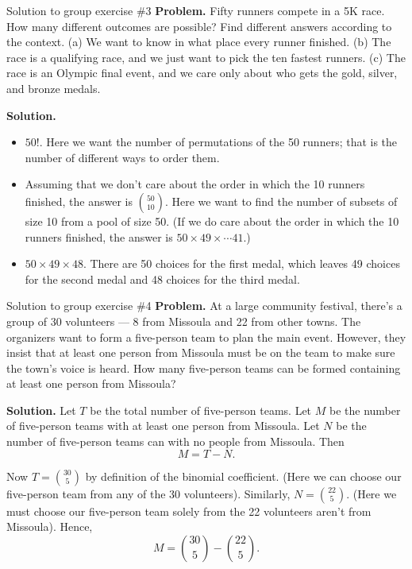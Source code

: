 \documentclass[10pt]{beamer}
\begin{document}
\begin{frame}{Solution to group exercise \#3}
\textbf{Problem.}
Fifty runners compete in a 5K race.  How many different outcomes are possible? Find different answers according to the context. (a) We want to know in what place every runner finished.  (b) The race is a qualifying race, and we just want to pick the ten fastest runners. (c) The race is an Olympic final event, and we care only about who gets the gold, silver, and bronze medals.

\vfill 
\textbf{Solution.}
\begin{itemize}
\item[a.] $50!$. Here we want the number of permutations of the 50 runners; that is the number of different ways to order them. 
\item[b.]  Assuming that we don't care about the order in which the 10 runners finished, the answer is $\binom{50}{10}$. Here we want to find the number of subsets of size 10 from a pool of size 50.  (If we do care about the order in which the 10 runners finished, the answer is $50 \times 49 \times \cdots 41$.)
\item[c.] $50 \times 49 \times 48$. There are 50 choices for the first medal, which leaves 49 choices for the second medal and 48 choices for the third medal. 
\end{itemize}
\end{frame}


\begin{frame}{Solution to group exercise \#4}
\small 
\textbf{Problem.}
At a large community festival, there’s a group of 30 volunteers — 8 from Missoula and 22 from other towns. The organizers want to form a five-person team to plan the main event. However, they insist that at least one person from Missoula must be on the team to make sure the town’s voice is heard. How many five-person teams can be formed containing at least one person from Missoula?

\vfill 
\textbf{Solution.}  Let $T$ be the total number of five-person teams.  Let $M$ be the number of five-person teams with at least one person from Missoula.   Let $N$ be the number of five-person teams can with no people from Missoula.  Then
\[ M = T - N. \]

Now $T=\binom{30}{5}$ by definition of the binomial coefficient. (Here we can choose our five-person team from any of the 30 volunteers). Similarly,  $N=\binom{22}{5}$. (Here we must choose our five-person team solely from the 22 volunteers aren't from Missoula). Hence,
\[M = \binom{30}{5} - \binom{22}{5}. \] 


\end{frame}
\end{document}
